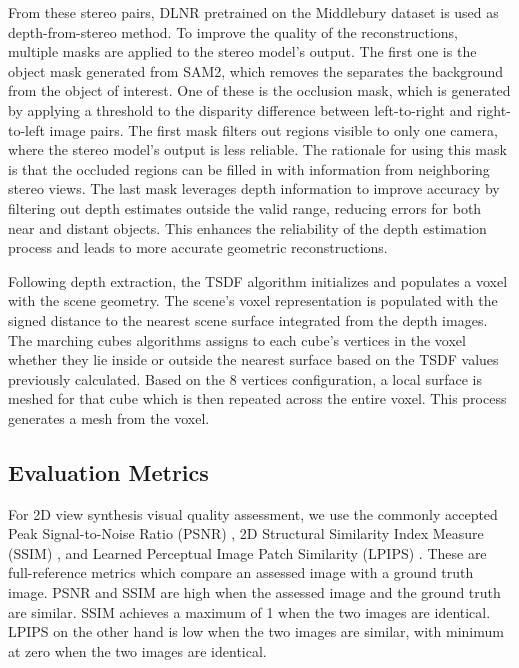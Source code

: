 From these stereo pairs, DLNR \cite{2023DLNR} pretrained on the Middlebury dataset\cite{2002middlefury} is used as depth-from-stereo method. To improve the quality of the reconstructions, multiple masks are applied to the stereo model's output. The first one is the object mask generated from SAM2, which removes the separates the background from the object of interest. One of these is the occlusion mask, which is generated by applying a threshold to the disparity difference between left-to-right and right-to-left image pairs. The first mask filters out regions visible to only one camera, where the stereo model's output is less reliable. The rationale for using this mask is that the occluded regions can be filled in with information from neighboring stereo views. The last mask leverages depth information to improve accuracy by filtering out depth estimates outside the valid range, reducing errors for both near and distant objects. This enhances the reliability of the depth estimation process and leads to more accurate geometric reconstructions.

Following depth extraction, the TSDF algorithm initializes and populates a voxel with the scene geometry. The scene's voxel representation is populated with the signed distance to the nearest scene surface integrated from the depth images. The marching cubes algorithms assigns to each cube's vertices in the voxel whether they lie inside or outside the nearest surface based on the TSDF values previously calculated. Based on the 8 vertices configuration, a local surface is meshed for that cube which is then repeated across the entire voxel. This process generates a mesh from the voxel.






\subsection{Evaluation Metrics}
For 2D view synthesis visual quality assessment, we use the commonly accepted Peak Signal-to-Noise Ratio (PSNR) \cite{psnr}, 2D Structural Similarity Index Measure (SSIM) \cite{2004ssim}, and Learned Perceptual Image Patch Similarity (LPIPS) \cite{lpips}. These are full-reference metrics which compare an assessed image with a ground truth image. PSNR and SSIM are high when the assessed image and the ground truth are similar. SSIM achieves a maximum of 1 when the two images are identical. LPIPS on the other hand is low when the two images are similar, with minimum at zero when the two images are identical.

